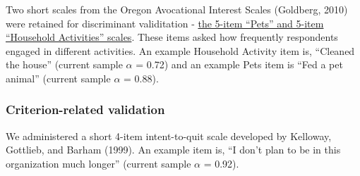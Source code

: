 \documentclass[
  man]{apa7}
\begin{document}
Two short scales from the Oregon Avocational Interest Scales (Goldberg, 2010) were retained for discriminant validitation - \href{https://ipip.ori.org/newORAISKey.htm\#Food-Related}{the 5-item ``Pets'' and 5-item ``Household Activities'' scales}. These items asked how frequently respondents engaged in different activities. An example Household Activity item is, ``Cleaned the house'' (current sample \(\alpha\) = 0.72) and an example Pets item is ``Fed a pet animal'' (current sample \(\alpha\) = 0.88).

\hypertarget{criterion-related-validation}{%
\subsubsection{Criterion-related validation}\label{criterion-related-validation}}

We administered a short 4-item intent-to-quit scale developed by Kelloway, Gottlieb, and Barham (1999). An example item is, ``I don't plan to be in this organization much longer'' (current sample \(\alpha\) = 0.92).
\end{document}
